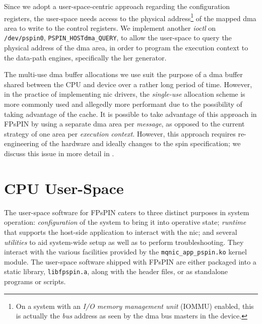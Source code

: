Since we adopt a user-space-centric approach regarding the configuration registers, the user-space needs access to the physical address\footnote{On a system with an \emph{I/O memory management unit} (IOMMU) enabled, this is actually the \emph{bus} address as seen by the \ac{dma} bus masters in the device.} of the mapped \ac{dma} area to write to the control registers.  We implement another \emph{ioctl} on \texttt{/dev/pspin0}, \texttt{PSPIN\_\-HOST\ac{dma}\_\-QUERY}, to allow the user-space to query the physical address of the \ac{dma} area, in order to program the execution context to the data-path engines, specifically the \ac{her} generator.

The multi-use \ac{dma} buffer allocations we use suit the purpose of a \ac{dma} buffer shared between the CPU and device over a rather long period of time.  However, in the practice of implementing \ac{nic} drivers, the \emph{single-use} allocation scheme is more commonly used and allegedly more performant due to the possibility of taking advantage of the cache.  It is possible to take advantage of this approach in FPsPIN by using a separate \ac{dma} area per \emph{message}, as opposed to the current strategy of one area per \emph{execution context}.  However, this approach requires re-engineering of the hardware and ideally changes to the \ac{spin} specification; we discuss this issue in more detail in .

\section{CPU User-Space} \label{sec:sw-lib}

The user-space software for FPsPIN caters to three distinct purposes in system operation: \emph{configuration} of the system to bring it into operative state; \emph{runtime} that supports the host-side application to interact with the \ac{nic}; and several \emph{utilities} to aid system-wide setup as well as to perform troubleshooting.  They interact with the various facilities provided by the \texttt{mqnic\_\-app\_\-pspin.ko} kernel module.  The user-space software shipped with FPsPIN are either packaged into a static library, \texttt{libfpspin.a}, along with the header files, or as standalone programs or scripts.

